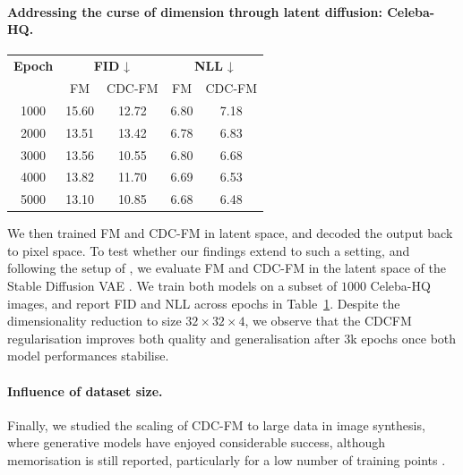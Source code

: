 \documentclass{article} %
\begin{document}
\paragraph{Addressing the curse of dimension through latent diffusion: Celeba-HQ.}
\begin{table}
    \centering
    \vspace{-1.5em}
    \vspace{-0.75em}
    {\scriptsize
    \begin{tabular}{ccccc}
        \toprule
        \textbf{Epoch} & \multicolumn{2}{c}{\textbf{FID} ↓} & \multicolumn{2}{c}{\textbf{NLL} ↓} \\
        & FM & CDC-FM & FM & CDC-FM \\
        \midrule
        1000 & 15.60 & 12.72 & 6.80 & 7.18 \\
        2000 & 13.51 & 13.42 & 6.78 & 6.83 \\
        3000 & 13.56 & 10.55 & 6.80 & 6.68 \\
        4000 & 13.82 & 11.70 & 6.69 & 6.53 \\
        5000 & 13.10 & 10.85 & 6.68 & 6.48 \\
        \bottomrule
    \end{tabular}
    }
    \vspace{-1.5em}
    \label{tab:fid_nll_latent}
\end{table}



We then trained FM and CDC-FM in latent space, and decoded the output back to pixel space. To test whether our findings extend to such a setting, and following the setup of \citet{dao2023flow}, we evaluate FM and CDC-FM in the latent space of the Stable Diffusion VAE \citep{rombach2022high}. 
We train both models on a subset of $1000$ Celeba-HQ images, and report FID and NLL across epochs in Table~\ref{tab:fid_nll_latent}. Despite the dimensionality reduction to size $32\times 32\times 4$, we observe that the CDCFM regularisation improves both quality and generalisation after $3$k epochs once both model performances stabilise.

\paragraph{Influence of dataset size.}
Finally, we studied the scaling of CDC-FM to large data in image synthesis, where generative models have enjoyed considerable success, although memorisation is still reported, particularly for a low number of training points \citep{Kadkhodaie2023GeneralizationRepresentations, gu_memorization_2023}. 
\end{document}

